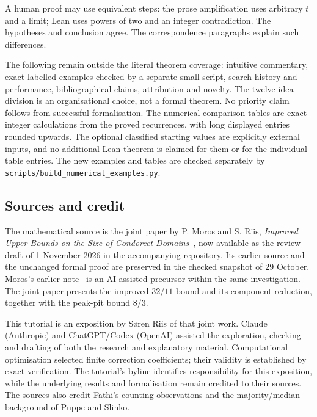 A human proof may use equivalent steps: the prose amplification uses
arbitrary \(t\) and a limit; Lean uses powers of two and an integer
contradiction. The hypotheses and conclusion agree. The correspondence
paragraphs explain such differences.

The following remain outside the literal theorem coverage: intuitive
commentary, exact labelled examples checked by a separate small script,
search history and performance, bibliographical claims, attribution and
novelty. The twelve-idea division is an organisational choice, not a
formal theorem. No priority claim follows from successful formalisation.
The numerical comparison tables are exact integer calculations from
the proved recurrences, with long displayed entries rounded upwards.
The optional classified starting values are explicitly external
inputs, and no additional Lean theorem is claimed for them or for
the individual table entries. The new examples and tables are checked
separately by \texttt{scripts/build\_numerical\_examples.py}.

\subsection{Sources and credit}
The mathematical source is the joint paper by P. Moros and S. Riis,
\emph{Improved Upper Bounds on the Size of Condorcet Domains}~\cite{joint},
now available as the review draft of 1 November 2026 in the accompanying
repository. Its earlier source and the unchanged formal proof are preserved
in the checked snapshot of 29 October. Moros's earlier note~\cite{moros}
is an AI-assisted precursor within the same investigation. The joint paper
presents the improved \(32/11\) bound and its component reduction,
together with the peak-pit bound \(8/3\).

This tutorial is an exposition by S\o ren Riis of that joint work.
Claude (Anthropic) and ChatGPT/Codex (OpenAI) assisted the exploration,
checking and drafting of both the research and explanatory material.
Computational optimisation selected finite correction coefficients;
their validity is established by exact verification. The tutorial's
byline identifies responsibility for this exposition, while the
underlying results and formalisation remain credited to their sources.
The sources also credit Fathi's counting observations and the
majority/median background of Puppe and Slinko.

